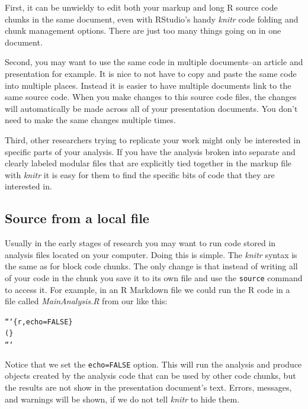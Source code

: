 {First, it can be unwieldy to edit both your markup and long R source code chunks in the same document, even with RStudio's handy {\emph{knitr}} code folding and chunk management options. There are just too many things going on in one document. 

Second, you may want to use the same code in multiple documents--an article and presentation for example. It is nice to not have to copy and paste the same code into multiple places. Instead it is easier to have multiple documents link to the same source code. When you make changes to this source code files, the changes will automatically be made across all of your presentation documents. You don't need to make the same changes multiple times.

Third, other researchers trying to replicate your work might only be interested in specific parts of your analysis. If you have the analysis broken into separate and clearly labeled modular files that are explicitly tied together in the markup file with {\emph{knitr}} it is easy for them to find the specific bits of code that they are interested in.

\subsection{Source from a local file}

Usually in the early stages of research you may want to run code stored in analysis files located on your computer. Doing this is simple. The {\emph{knitr}} syntax is the same as for block code chunks. The only change is that instead of writing all of your code in the chunk you save it to its own file and use the \texttt{source} command to access it. For example, in an R Markdown file we could run the R code in a file called {\emph{MainAnalysis.R}} from our {} like this:

\begin{knitrout}
\color{fgcolor}\begin{kframe}
\begin{alltt}
```\{r, echo=FALSE\}
(\}
```
\end{alltt}
\end{kframe}
\end{knitrout}


Notice that we set the \texttt{echo=FALSE} option. This will run the analysis and produce objects created by the analysis code that can be used by other code chunks, but the results are not show in the presentation document's text. Errors, messages, and warnings will be shown, if we do not tell {\emph{knitr}} to hide them.

}
